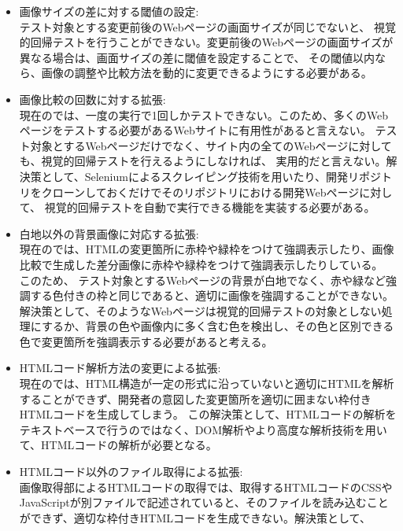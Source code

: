 \begin{itemize}
      \setlength{\itemsep}{0pt}
            \setlength{\parsep}{0pt}
      \item 画像サイズの差に対する閾値の設定:\\
            テスト対象とする変更前後のWebページの画面サイズが同じでないと、
            視覚的回帰テストを行うことができない。変更前後のWebページの画面サイズが異なる場合は、画面サイズの差に閾値を設定することで、
            その閾値以内なら、画像の調整や比較方法を動的に変更できるようにする必要がある。
      \item 画像比較の回数に対する拡張:\\
            現在の\toolName では、一度の実行で1回しかテストできない。このため、多くのWebページをテストする必要があるWebサイトに有用性があると言えない。
            テスト対象とするWebページだけでなく、サイト内の全てのWebページに対しても、視覚的回帰テストを行えるようにしなければ、
            実用的だと言えない。解決策として、Seleniumによるスクレイピング技術を用いたり、開発リポジトリをクローンしておくだけでそのリポジトリにおける開発Webページに対して、
            視覚的回帰テストを自動で実行できる機能を実装する必要がある。
      \item 白地以外の背景画像に対応する拡張:\\
            現在の\toolName では、HTMLの変更箇所に赤枠や緑枠をつけて強調表示したり、画像比較で生成した差分画像に赤枠や緑枠をつけて強調表示したりしている。
            このため、
            テスト対象とするWebページの背景が白地でなく、赤や緑など強調する色付きの枠と同じであると、適切に画像を強調することができない。
            解決策として、そのようなWebページは視覚的回帰テストの対象としない処理にするか、背景の色や画像内に多く含む色を検出し、その色と区別できる色で変更箇所を強調表示する必要があると考える。
      \item HTMLコード解析方法の変更による拡張:\\
            現在の\toolName では、HTML構造が一定の形式に沿っていないと適切にHTMLを解析することができず、開発者の意図した変更箇所を適切に囲まない枠付きHTMLコードを生成してしまう。
            この解決策として、HTMLコードの解析をテキストベースで行うのではなく、DOM解析やより高度な解析技術を用いて、HTMLコードの解析が必要となる。
      \item HTMLコード以外のファイル取得による拡張:\\
            画像取得部によるHTMLコードの取得では、取得するHTMLコードのCSSやJavaScriptが別ファイルで記述されていると、そのファイルを読み込むことができず、適切な枠付きHTMLコードを生成できない。解決策として、

\end{itemize}
